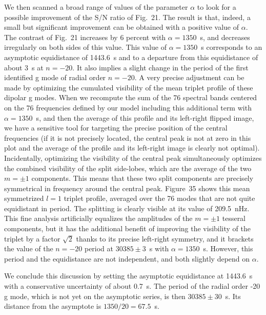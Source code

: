 \documentclass[bibyear]{aa}
\begin{document}
We then scanned a broad range of values of the parameter  $\alpha$ to look for a possible 
improvement of the S/N ratio of Fig.~21. The result is that, indeed, a small but significant improvement can be obtained with a positive value of  $\alpha$. The contrast of Fig.~21 increases by 6 percent with   $\alpha=1350$~s, and decreases irregularly on both sides of this value. This value of  $\alpha=1350$~s corresponds to an asymptotic equidistance of 1443.6~s and to a departure from this equidistance  of about 3~s at $n=-20$. It also implies a slight change in the period of the first identified g mode of radial order $n=-20$. A very precise adjustment can be made by optimizing the cumulated visibility of the mean triplet profile of these dipolar g modes. When we recompute the sum of the 76 spectral bands centered on the 76 frequencies defined by our model including this additional term  with  $\alpha=1350$~s, and then the average of this profile and its left-right flipped image, we have a sensitive tool for targeting the precise position of the central frequencies (if it is not precisely located, the central peak is not at zero in this plot and the average of the profile and its left-right image is clearly not optimal).
Incidentally, optimizing the visibility of the central peak simultaneously optimizes the combined visibility of the split side-lobes, which are the average of the two $m=\pm 1$ components. This means that these two split components are precisely symmetrical in frequency around the central peak. Figure~35 shows this mean symmetrized $l=1$ triplet profile, averaged over the 76 modes that are not quite equidistant in period. The splitting is clearly visible at its value of 209.5~nHz.
This fine analysis artificially equalizes the amplitudes of the $m=\pm 1$ tesseral components, but it has the additional benefit of improving the visibility of the triplet
by a factor $\sqrt2$ thanks to its precise left-right symmetry, and it brackets the value of the $n= -20$ period at $30385\pm 3$~s with $\alpha=1350$~s. However, this period and the equidistance are not independent, and both slightly depend on $\alpha$.

We conclude this discussion by setting the asymptotic equidistance at 1443.6~s with a conservative uncertainty of about 0.7~s. The period of the radial order -20 g mode, which is not yet on the asymptotic series, is then  $30385\pm 30$~s. Its distance from the asymptote is $1350/20=67.5$~s. 
\end{document}
